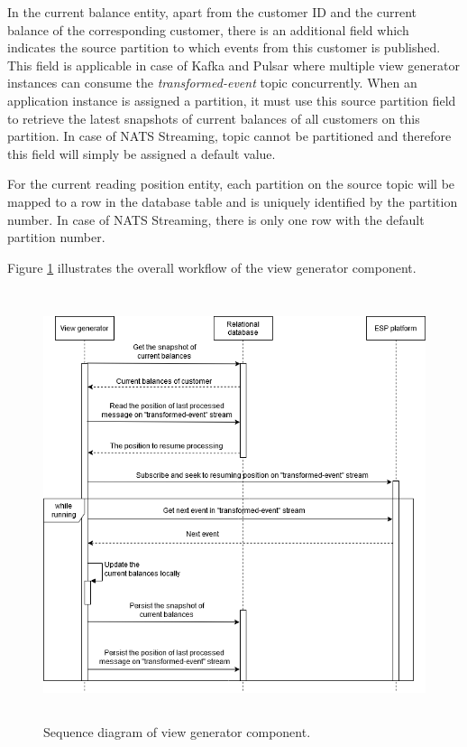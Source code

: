  

In the current balance entity, apart from the customer ID and the current balance of the corresponding customer, there is an additional field which indicates the source partition to which events from this customer is published. This field is applicable in case of Kafka and Pulsar where multiple view generator instances can consume the \emph{transformed-event} topic concurrently. When an application instance is assigned a partition, it must use this source partition field to retrieve the latest snapshots of current balances of all customers on this partition. In case of NATS Streaming, topic cannot be partitioned and therefore this field will simply be assigned a default value. 


 
For the current reading position entity, each partition on the source topic will be mapped to a row in the database table and is uniquely identified by the partition number. In case of NATS Streaming, there is only one row with the default partition number. 


Figure \ref{fig:implementviewgenerator} illustrates the overall workflow of the view generator component.

\begin{figure}[h]
	\centering
	\includegraphics[width=\linewidth,height=12.6cm]{images/implement-view-generator.png}
	\caption{Sequence diagram of view generator component.}
	\label{fig:implementviewgenerator}
\end{figure}


